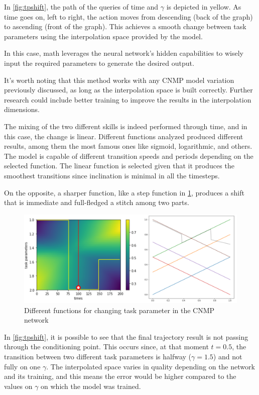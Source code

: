 In \cref{fig:tpshift}, the path of the queries of time and $\gamma$ is depicted in yellow. As time goes on, left to right, the action moves from descending (back of the graph) to ascending (front of the graph). This achieves a smooth change between task parameters using the interpolation space provided by the model. 

In this case, math leverages the neural network's hidden capabilities to wisely input the required parameters to generate the desired output. 

It's worth noting that this method works with any CNMP model variation previously discussed, as long as the interpolation space is built correctly. Further research could include better training to improve the results in the interpolation dimensions.  

The mixing of the two different skills is indeed performed through time, and in this case, the change is linear. Different functions analyzed produced different results, among them the most famous ones like sigmoid, logarithmic, and others. The model is capable of different transition speeds and periods depending on the selected function. The linear function is selected given that it produces the smoothest transitions since inclination is minimal in all the timesteps. 

On the opposite, a sharper function, like a step function in \cref{fig:tpshift-diff-functions}, produces a shift that is immediate and full-fledged a stitch among two parts. 

\begin{figure}
    \centering
    \includegraphics[width=0.8\linewidth]{figures/tpshift-diff-functions.png}
    \caption{ Different functions for changing task parameter in the CNMP network }
    \label{fig:tpshift-diff-functions}
\end{figure}

In \cref{fig:tpshift}, it is possible to see that the final trajectory result is not passing through the conditioning point. This occurs since, at that moment $t=0.5$, the transition between two different task parameters is halfway ($\gamma=1.5$) and not fully on one $\gamma$. The interpolated space varies in quality depending on the network and its training, and this means the error would be higher compared to the values on $\gamma$ on which the model was trained. 

